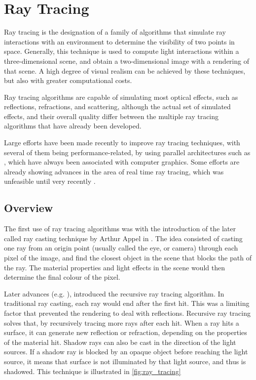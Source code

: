 \documentclass[main.tex]{subfiles}
\begin{document}
\section{Ray Tracing} \label{section:ray_tracing}

Ray tracing is the designation of a family of algorithms that simulate ray interactions with an environment to determine the visibility of two points in space.
Generally, this technique is used to compute light interactions within a three-dimensional scene, and obtain a two-dimensional image with a rendering of that scene. A high degree of visual realism can be achieved by these techniques, but also with greater computational costs.

Ray tracing algorithms are capable of simulating most optical effects, such as reflections, refractions, and scattering, although the actual set of simulated effects, and their overall quality differ between the multiple ray tracing algorithms that have already been developed.

Large efforts have been made recently to improve ray tracing techniques, with several of them being performance-related, by using parallel architectures such as \gpus, which have always been associated with computer graphics. Some efforts are already showing advances in the area of real time ray tracing, which was unfeasible until very recently \cite{parker2010optix,huss2004real}.


\subsection{Overview}

The first use of ray tracing algorithms was with the introduction of the later called ray casting technique by Arthur Appel in \cite{appel1968some}. The idea consisted of casting one ray from an origin point (usually called the eye, or camera) through each pixel of the image, and find the closest object in the scene that blocks the path of the ray. The material properties and light effects in the scene would then determine the final colour of the pixel.

Later advances (e.g. \cite{whitted2005improved}), introduced the recursive ray tracing algorithm. In traditional ray casting, each ray would end after the first hit. This was a limiting factor that prevented the rendering to deal with reflections. Recursive ray tracing solves that, by recursively tracing more rays after each hit. When a ray hits a surface, it can generate new reflection or refraction, depending on the properties of the material hit. Shadow rays can also be cast in the direction of the light sources. If a shadow ray is blocked by an opaque object before reaching the light source, it means that surface is not illuminated by that light source, and thus is shadowed. This technique is illustrated in \cref{fig:ray_tracing}
\end{document}

